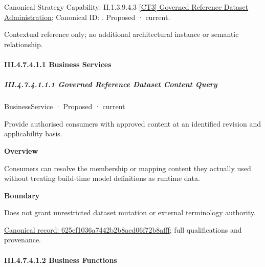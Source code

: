 {\small Canonical Strategy Capability: II.1.3.9.4.3 \hyperref[element:682b8684ad9e49d5a5c348a148081607]{[CT3] Governed Reference Dataset Administration}; Canonical ID: \texttt{}. Proposed · current.}\par
Contextual reference only; no additional architectural instance or semantic relationship.\par
\paragraph*{III.4.7.4.1.1 Business Services}
\label{navigation:III.4.7.4.1.1}

\subparagraph*{III.4.7.4.1.1.1 Governed Reference Dataset Content Query}
\label{navigation:III.4.7.4.1.1.1}

\label{element:625ef1036a7442b2b8aed06f72b8afff}
{\small BusinessService · Proposed · current}\par

Provide authorised consumers with approved content at an identified revision and applicability basis.



\textbf{Overview}



Consumers can resolve the membership or mapping content they actually used without treating build-time model definitions as runtime data.



\textbf{Boundary}



Does not grant unrestricted dataset mutation or external terminology authority.


{\footnotesize \href{../../../../continuum/business/business-service/625ef1036a7442b2b8aed06f72b8afff.md}{Canonical record: 625ef1036a7442b2b8aed06f72b8afff}; full qualifications and provenance.}\par
\paragraph*{III.4.7.4.1.2 Business Functions}
\label{navigation:III.4.7.4.1.2}

